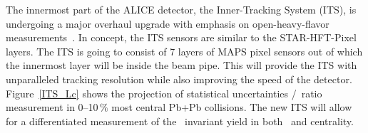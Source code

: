 The innermost part of the ALICE detector, the Inner-Tracking System (ITS),  is undergoing a major overhaul upgrade with emphasis on open-heavy-flavor measurements~\cite{ITS_CDR}\@. In concept, the ITS sensors are similar to the STAR-HFT-Pixel~\cite{HftFinal} layers. The ITS is going to consist of 7 layers of MAPS pixel sensors out of which the innermost layer will be inside the beam pipe. This will provide the ITS with unparalleled tracking resolution while also improving the speed of the detector. Figure~\ref{ITS_Lc} shows the projection of statistical uncertainties \Lambdac/\dzero\ ratio measurement in 0--10$\,\%$ most central Pb+Pb collisions. The new ITS will allow for a differentiated measurement of the \Lambdac\ invariant yield in both \pt\ and centrality. 

